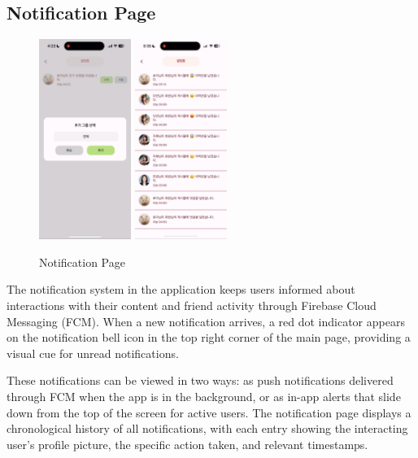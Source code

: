 \documentclass[conference]{IEEEtran}
\begin{document}
       \subsection{Notification Page}
        \begin{figure}[htbp]
            \centerline{
            \includegraphics[width=3cm]{Images/page/notification1.png}
            \includegraphics[width=3cm]{Images/page/notification2.png}}
              \caption{Notification Page}
            \label{fig}
        \end{figure}
        The notification system in the application keeps users informed about interactions with their content and friend activity through Firebase Cloud Messaging (FCM). When a new notification arrives, a red dot indicator appears on the notification bell icon in the top right corner of the main page, providing a visual cue for unread notifications.

        These notifications can be viewed in two ways: as push notifications delivered through FCM when the app is in the background, or as in-app alerts that slide down from the top of the screen for active users. The notification page displays a chronological history of all notifications, with each entry showing the interacting user's profile picture, the specific action taken, and relevant timestamps.
\end{document}
